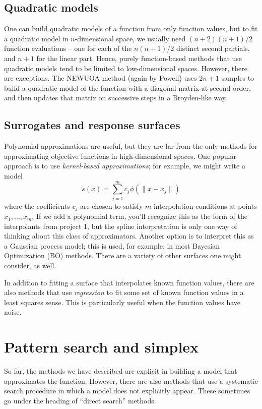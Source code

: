 \documentclass[12pt, leqno]{article} %
\begin{document}
\subsection{Quadratic models}

One can build quadratic models of a function from only function values,
but to fit a quadratic model in \(n\)-dimensional space, we usually need
\((n+2)(n+1)/2\) function evaluations -- one for each of the
\(n(n+1)/2\) distinct second partials, and \(n+1\) for the linear part.
Hence, purely function-based methods that use quadratic models tend to
be limited to low-dimensional spaces. However, there are exceptions. The
NEWUOA method (again by Powell) uses \(2n+1\) samples to build a
quadratic model of the function with a diagonal matrix at second order,
and then updates that matrix on successive steps in a Broyden-like way.

\subsection{Surrogates and response surfaces}

Polynomial approximations are useful, but they are far from the only
methods for approximating objective functions in high-dimensional
spaces. One popular approach is to use \emph{kernel-based
approximations}; for example, we might write a model
\[s(x) = \sum_{j=1}^m c_j \phi(\|x-x_j\|)\] where the coefficients
\(c_j\) are chosen to satisfy \(m\) interpolation conditions at points
\(x_1, \ldots, x_m\). If we add a polynomial term, you'll recognize this
as the form of the interpolants from project 1, but the spline
interpretation is only one way of thinking about this class of
approximators. Another option is to interpret this as a Gaussian process
model; this is used, for example, in most Bayesian Optimization (BO)
methods. There are a variety of other surfaces one might consider, as
well.

In addition to fitting a surface that interpolates known function
values, there are also methods that use \emph{regression} to fit some
set of known function values in a least squares sense. This is
particularly useful when the function values have noise.

\section{Pattern search and simplex}

So far, the methods we have described are explicit in building a model
that approximates the function. However, there are also methods that use
a systematic search procedure in which a model does not explicitly
appear. These sometimes go under the heading of ``direct search''
methods.
\end{document}
